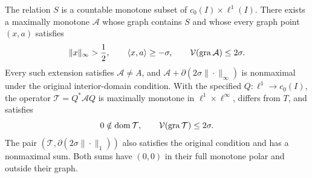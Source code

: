 \renewcommand{\thetheorem}{N}
\begin{theorem}
\label{thm:nonconstructive}
The relation $S$ is a countable monotone subset of
$c_0(I)\times\ell^1(I)$. There exists a maximally monotone
$\mathcal A$ whose graph contains $S$ and whose every graph point $(x,a)$ satisfies
\[
\|x\|_\infty>\frac{1}{2},\qquad \langle x,a\rangle\ge-\sigma,
\qquad \mathcal V(\operatorname{gra}\mathcal A)\le2\sigma.
\]
Every such extension satisfies $\mathcal A\ne A$, and
$\mathcal A+\partial(2\sigma\|\cdot\|_\infty)$ is nonmaximal under
the original interior-domain condition.
With the specified $Q:\ell^1\to c_0(I)$, the operator
$\mathcal T=Q^*\mathcal A Q$ is maximally monotone in
$\ell^1\times\ell^\infty$, differs from $T$, and satisfies
\[
0\notin\operatorname{dom}\mathcal T,\qquad
\mathcal V(\operatorname{gra}\mathcal T)\le2\sigma.
\]
The pair $(\mathcal T,\partial(2\sigma\|\cdot\|_1))$ also satisfies
the original condition and has a nonmaximal sum. Both sums have
$(0,0)$ in their full monotone polar and outside their graph.
\end{theorem}
